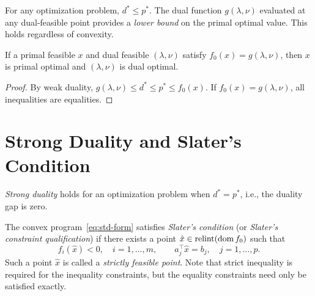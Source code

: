\documentclass[11pt,a4paper]{article}
\begin{document}
\begin{keyresult}[title={Weak Duality}]
For any optimization problem, $d^* \le p^*$. The dual function $g(\lambda, \nu)$
evaluated at any dual-feasible point provides a \emph{lower bound} on the primal
optimal value. This holds regardless of convexity.
\end{keyresult}

\begin{corollary}\label{cor:certificate}
If a primal feasible $x$ and dual feasible $(\lambda, \nu)$ satisfy
$f_0(x) = g(\lambda, \nu)$, then $x$ is primal optimal and
$(\lambda, \nu)$ is dual optimal.
\end{corollary}

\begin{proof}
By weak duality, $g(\lambda, \nu) \le d^* \le p^* \le f_0(x)$. If
$f_0(x) = g(\lambda, \nu)$, all inequalities are equalities.
\end{proof}


\section{Strong Duality and Slater's Condition}\label{sec:strong-duality}

\begin{definition}\label{def:strong-duality}
\emph{Strong duality} holds for an optimization problem when $d^* = p^*$,
i.e., the duality gap is zero.
\end{definition}

\begin{definition}\label{def:slater}
The convex program~\eqref{eq:std-form} satisfies \emph{Slater's condition}
(or \emph{Slater's constraint qualification}) if there exists a point
$\hat{x} \in \text{relint}(\operatorname{dom} f_0)$ such that
\begin{equation}\label{eq:slater}
  f_i(\hat{x}) < 0, \quad i = 1,\dots,m, \qquad
  a_j^\top \hat{x} = b_j, \quad j = 1,\dots,p.
\end{equation}
Such a point $\hat{x}$ is called a \emph{strictly feasible point}. Note
that strict inequality is required for the inequality constraints, but the
equality constraints need only be satisfied exactly.
\end{definition}
\end{document}
